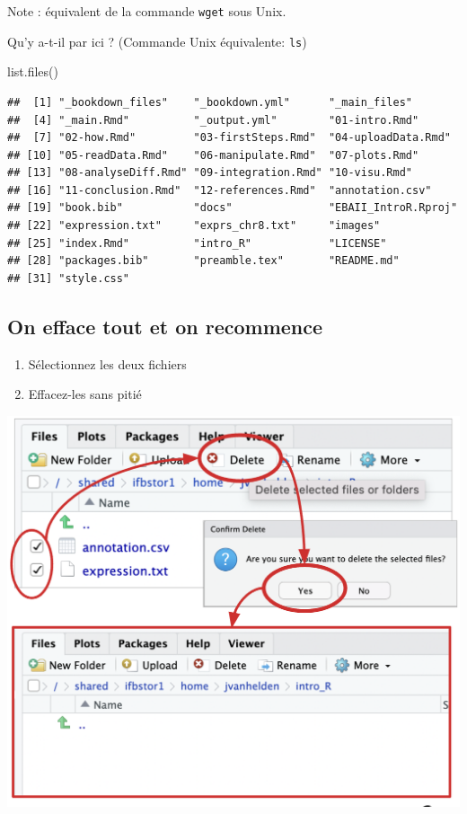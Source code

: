 \documentclass[
]{book}
\newenvironment{Shaded}{\begin{snugshade}}{\end{snugshade}}
\newcommand{\FunctionTok}[1]{\textcolor[rgb]{0.00,0.00,0.00}{#1}}
\newcommand{\NormalTok}[1]{#1}
\providecommand{\tightlist}{%
  \setlength{\itemsep}{0pt}\setlength{\parskip}{0pt}}
\begin{document}
Note : équivalent de la commande \texttt{wget} sous Unix.

Qu'y a-t-il par ici ? (Commande Unix équivalente: \texttt{ls})

\begin{Shaded}
\begin{Highlighting}[]
\FunctionTok{list.files}\NormalTok{()}
\end{Highlighting}
\end{Shaded}

\begin{verbatim}
##  [1] "_bookdown_files"    "_bookdown.yml"      "_main_files"       
##  [4] "_main.Rmd"          "_output.yml"        "01-intro.Rmd"      
##  [7] "02-how.Rmd"         "03-firstSteps.Rmd"  "04-uploadData.Rmd" 
## [10] "05-readData.Rmd"    "06-manipulate.Rmd"  "07-plots.Rmd"      
## [13] "08-analyseDiff.Rmd" "09-integration.Rmd" "10-visu.Rmd"       
## [16] "11-conclusion.Rmd"  "12-references.Rmd"  "annotation.csv"    
## [19] "book.bib"           "docs"               "EBAII_IntroR.Rproj"
## [22] "expression.txt"     "exprs_chr8.txt"     "images"            
## [25] "index.Rmd"          "intro_R"            "LICENSE"           
## [28] "packages.bib"       "preamble.tex"       "README.md"         
## [31] "style.css"
\end{verbatim}

\hypertarget{on-efface-tout-et-on-recommence-1}{%
\subsection{On efface tout et on recommence}\label{on-efface-tout-et-on-recommence-1}}

\begin{enumerate}
\def\labelenumi{\arabic{enumi}.}
\tightlist
\item
  Sélectionnez les deux fichiers
\item
  Effacez-les sans pitié
\end{enumerate}

\includegraphics{images/delete.png}
\end{document}
